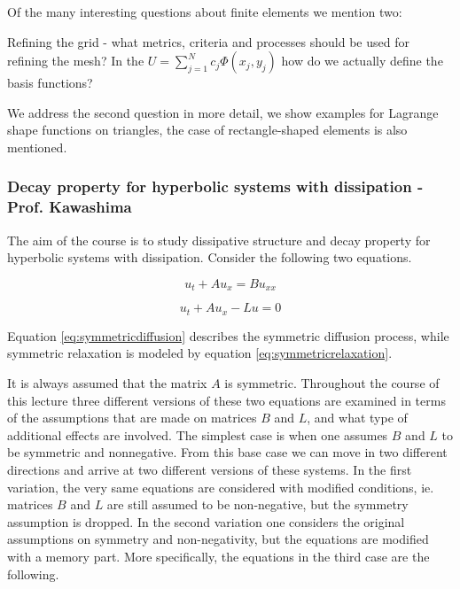 \documentclass{article}
\begin{document}
Of the many interesting questions about finite elements we mention two:

\begin{outline}[enumerate]
\1 Refining the grid - what metrics, criteria and processes should be used for refining the mesh?
\1 In the $U = \sum_{j=1}^{N} c_j \Phi(x_j, y_j)$ how do we actually define the basis functions?
\end{outline}

We address the second question in more detail, we show examples for Lagrange shape functions on triangles, the case of rectangle-shaped elements is also mentioned.

\subsubsection{Decay property for hyperbolic systems with dissipation - Prof. Kawashima}
The aim of the course is to study dissipative structure and decay property for hyperbolic systems with dissipation. Consider the following two equations.

\begin{equation} \label{eq:symmetricdiffusion}
u_{t} + Au_{x} = Bu_{xx}
\end{equation}

\begin{equation} \label{eq:symmetricrelaxation}
u_{t} + Au_{x} -Lu = 0
\end{equation}

Equation \ref{eq:symmetricdiffusion} describes the symmetric diffusion process, while symmetric relaxation is modeled by equation \ref{eq:symmetricrelaxation}.

It is always assumed that the matrix $A$ is symmetric. Throughout the course of this lecture three different versions of these two equations are examined in terms of the assumptions that are made on matrices $B$ and $L$, and what type of additional effects are involved. The simplest case is when one assumes $B$ and $L$ to be symmetric and nonnegative. From this base case we can move in two different directions and arrive at two different versions of these systems. In the first variation, the very same equations are considered with modified conditions, ie. matrices $B$ and $L$ are still assumed to be non-negative, but the symmetry assumption is dropped. In the second variation one considers the original assumptions on symmetry and non-negativity, but the equations are modified with a memory part. More specifically, the equations in the third case are the following.
\end{document}
